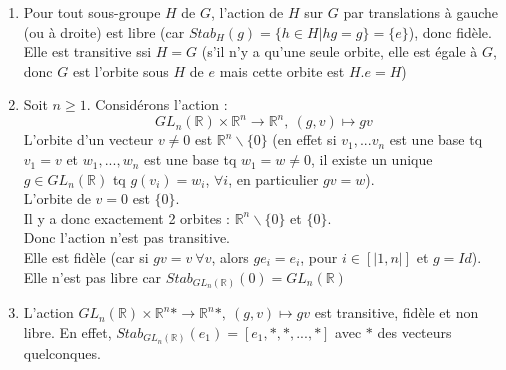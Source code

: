 \documentclass[a4paper, oneside]{report}
\theoremstyle{break}
\newcommand{\x}{\times}
\newcommand{\R}{\mathbb{R}}
\begin{document}
\exem
\begin{enumerate}
\item Pour tout sous-groupe $H$ de $G$, l'action de $H$ sur $G$ par translations à gauche (ou à droite) est libre (car $Stab_H(g)=\{h\in H |hg=g \}=\{e\}$), donc fidèle.\\
Elle est transitive ssi $H=G$ (s'il n'y a qu'une seule orbite, elle est égale à $G$, donc $G$ est l'orbite sous $H$ de $e$ mais cette orbite est $H.e=H$)
\item Soit $n\geq 1$. Considérons l'action :
$$GL_n(\R)\x \R^n \rightarrow \R^n,~(g,v)\mapsto gv $$
L'orbite d'un vecteur $v\neq 0$ est $\R^n\backslash \{0\}$ (en effet si $v_1,...v_n$ est une base tq $v_1 = v$ et $w_1,...,w_n$ est une base tq $w_1=w\neq 0$, il existe un unique $g\in GL_n(\R)$ tq $g(v_i)=w_i$, $\forall i$, en particulier $gv=w$).\\
L'orbite de $v=0$ est $\{0\}$.\\
Il y a donc exactement 2 orbites : $\R^n\backslash \{0\}$ et $\{0\}$.\\
Donc l'action n'est pas transitive.\\
Elle est fidèle (car si $gv=v~\forall v$, alors $ge_i=e_i$, pour $i\in [|1,n|]$ et $g=Id$).\\
Elle n'est pas libre car $Stab_{GL_n(\R)}(0)=GL_n(\R)$

\item L'action $GL_n(\R)\x \R^n* \rightarrow \R^n*,~(g,v)\mapsto gv $ est transitive, fidèle et non libre. En effet, $Stab_{GL_n(\R)}(e_1)=[e_1,*,*,...,*]$ avec $*$ des vecteurs quelconques.


\end{enumerate}
\end{document}
